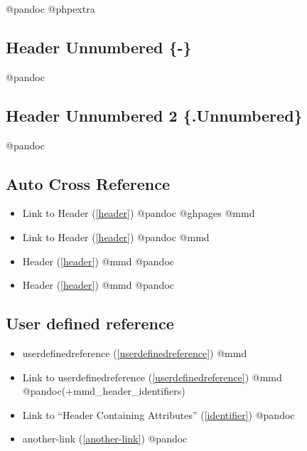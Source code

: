 @pandoc @phpextra

\subsection{Header Unnumbered \{-\}}
\label{headerunnumbered-}

@pandoc

\subsection{Header Unnumbered 2 \{.Unnumbered\}}
\label{headerunnumbered2.unnumbered}

@pandoc

\subsection{Auto Cross Reference}
\label{autocrossreference}

\begin{itemize}
\item Link to Header (\autoref{header}) @pandoc @ghpages @mmd

\item Link to Header (\autoref{header}) @pandoc @mmd

\item Header (\autoref{header}) @mmd @pandoc

\item Header (\autoref{header}) @mmd @pandoc

\end{itemize}

\subsection{User defined reference}
\label{userdefinedreference}

\begin{itemize}
\item userdefinedreference (\autoref{userdefinedreference}) @mmd

\item Link to userdefinedreference (\autoref{userdefinedreference}) @mmd @pandoc(+mmd\_header\_identifiers)

\item Link to ``Header Containing Attributes'' (\autoref{identifier}) @pandoc

\item another-link (\autoref{another-link}) @pandoc

\end{itemize}

